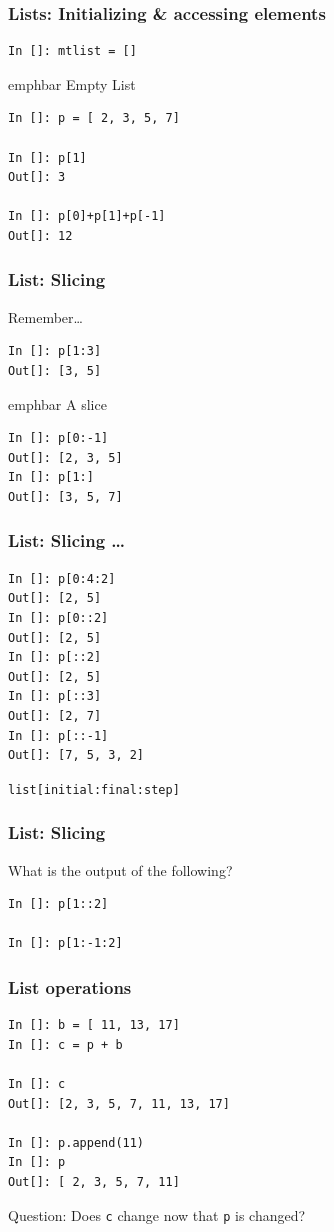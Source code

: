 \documentclass[14pt,compress]{beamer}
\newcommand{\emphbar}[1]
{\begin{beamercolorbox}[rounded=true]{emphbar} 
      {#1}
 \end{beamercolorbox}
}
\newcounter{time}
\newcommand{\inctime}[1]{\addtocounter{time}{#1}{\tiny \thetime\ m}}
\newcommand{\typ}[1]{\lstinline{#1}}
\newcommand{\kwrd}[1]{ \texttt{\textbf{\color{blue}{#1}}}  }
\begin{document}
\begin{frame}[fragile]
\frametitle{Lists: Initializing \& accessing elements}
\begin{lstlisting}
In []: mtlist = [] 
\end{lstlisting}
\emphbar{Empty List}
\begin{lstlisting}
In []: p = [ 2, 3, 5, 7] 

In []: p[1]
Out[]: 3

In []: p[0]+p[1]+p[-1]
Out[]: 12
\end{lstlisting}
\end{frame}

\begin{frame}[fragile]
  \frametitle{List: Slicing}
  \begin{block}{Remember\ldots}
	\kwrd{In []: p = [ 2, 3, 5, 7]}
  \end{block}
\begin{lstlisting}
In []: p[1:3]
Out[]: [3, 5]
\end{lstlisting}
\emphbar{A slice}
\begin{lstlisting}
In []: p[0:-1]
Out[]: [2, 3, 5]
In []: p[1:]
Out[]: [3, 5, 7]
\end{lstlisting}
\end{frame}

\begin{frame}[fragile]
  \frametitle{List: Slicing \ldots}
\begin{lstlisting}
In []: p[0:4:2]
Out[]: [2, 5]
In []: p[0::2]
Out[]: [2, 5]
In []: p[::2]
Out[]: [2, 5]
In []: p[::3]
Out[]: [2, 7]
In []: p[::-1]
Out[]: [7, 5, 3, 2]
\end{lstlisting}
\alert{\typ{list[initial:final:step]}}
\end{frame}

\begin{frame}[fragile]
  \frametitle{List: Slicing}
  What is the output of the following?
\begin{lstlisting}
In []: p[1::2]

In []: p[1:-1:2]
\end{lstlisting}
\end{frame}


\begin{frame}[fragile]
\frametitle{List operations}
\begin{lstlisting}
In []: b = [ 11, 13, 17]
In []: c = p + b

In []: c
Out[]: [2, 3, 5, 7, 11, 13, 17]

In []: p.append(11)
In []: p
Out[]: [ 2, 3, 5, 7, 11]
\end{lstlisting}
Question: Does \typ{c} change now that \typ{p} is changed?
\end{frame}
\end{document}

